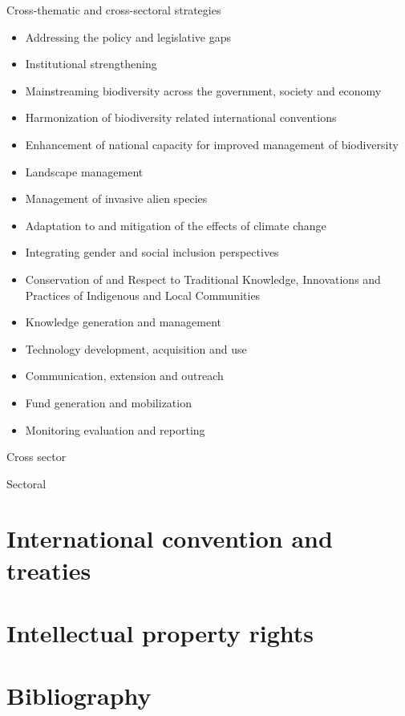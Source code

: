 \documentclass[ignorenonframetext,aspectratio=169]{beamer}
\providecommand{\tightlist}{%
  \setlength{\itemsep}{0pt}\setlength{\parskip}{0pt}}
\begin{document}
\begin{frame}{Cross-thematic and cross-sectoral strategies}
\protect\hypertarget{cross-thematic-and-cross-sectoral-strategies}{}

\begin{itemize}
\tightlist
\item
  Addressing the policy and legislative gaps
\item
  Institutional strengthening
\item
  Mainstreaming biodiversity across the government, society and economy
\item
  Harmonization of biodiversity related international conventions
\item
  Enhancement of national capacity for improved management of
  biodiversity
\item
  Landscape management
\item
  Management of invasive alien species
\item
  Adaptation to and mitigation of the effects of climate change
\item
  Integrating gender and social inclusion perspectives
\item
  Conservation of and Respect to Traditional Knowledge, Innovations and
  Practices of Indigenous and Local Communities
\item
  Knowledge generation and management
\item
  Technology development, acquisition and use
\item
  Communication, extension and outreach
\item
  Fund generation and mobilization
\item
  Monitoring evaluation and reporting
\end{itemize}

\end{frame}

\begin{frame}{Cross sector}
\protect\hypertarget{cross-sector}{}

\end{frame}

\begin{frame}{Sectoral}
\protect\hypertarget{sectoral}{}

\end{frame}

\hypertarget{international-convention-and-treaties}{%
\section{International convention and
treaties}\label{international-convention-and-treaties}}

\hypertarget{intellectual-property-rights}{%
\section{Intellectual property
rights}\label{intellectual-property-rights}}

\hypertarget{bibliography}{%
\section{Bibliography}\label{bibliography}}
\end{document}
